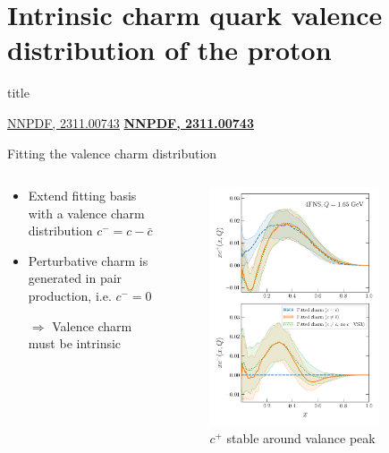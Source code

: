 \documentclass[aspectratio=43, 8pt,t]{beamer}
\newcommand{\SectionTitleFrame}[1][]{%
  \begin{frame}
    \vfill
    \centering
    \begin{beamercolorbox}[sep=8pt,center,shadow=true,rounded=true]{title}
      \usebeamerfont{title}\insertsection\par
    \end{beamercolorbox}
    \ifx\relax#1\relax\else
      \vspace{0.5cm}
      \textbf{#1}
    \fi
    \vfill
  \end{frame}
}
\begin{document}
\section*{Intrinsic charm quark valence distribution of the proton}
\SectionTitleFrame[\hyperlink{https://arxiv.org/abs/2311.00743}{NNPDF, 2311.00743}]


\begin{frame}{Fitting the valence charm distribution}
  \begin{columns}
    \begin{column}{0.49\columnwidth}
      \begin{itemize}
        \item Extend fitting basis with a valence charm distribution $c^-=c-\bar{c}$
        \item Perturbative charm is generated in pair production, i.e. $c^-=0$
        \item[$\Rightarrow$] Valence charm must be intrinsic
      \end{itemize}
    \end{column}
    \begin{column}{0.49\columnwidth}
      \begin{figure}
        \includegraphics[width=0.8\textwidth]{CharmAsymmetry-q1p65gev-Fig1Main-noVSR.pdf}
        \caption*{$c^+$ stable around valance peak}
      \end{figure}
    \end{column}
  \end{columns}
\end{frame}
\end{document}
